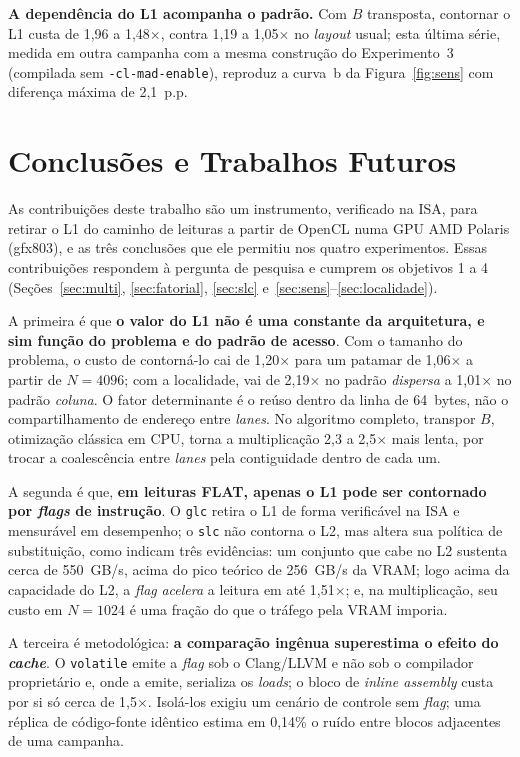 \documentclass[12pt]{article}
\begin{document}
\textbf{A dependência do L1 acompanha o padrão.} Com $B$ transposta, contornar o
L1 custa de 1,96 a 1,48$\times$, contra 1,19 a 1,05$\times$ no \textit{layout}
usual; esta última série, medida em outra campanha com a mesma construção do
Experimento~3 (compilada sem \texttt{-cl-mad-enable}), reproduz a curva~b da Figura~\ref{fig:sens} com diferença máxima de 2,1~p.p.

\section{Conclusões e Trabalhos Futuros}
\label{sec:conclusao}

As contribuições deste trabalho são um instrumento, verificado na ISA, para retirar
o L1 do caminho de leituras a partir de OpenCL numa GPU AMD Polaris (gfx803), e
as três conclusões que ele permitiu nos quatro experimentos. Essas contribuições respondem à
pergunta de pesquisa e cumprem os objetivos 1 a 4 (Seções~\ref{sec:multi},
\ref{sec:fatorial}, \ref{sec:slc} e~\ref{sec:sens}--\ref{sec:localidade}).

A primeira é que \textbf{o valor do L1 não é uma constante da arquitetura, e sim
função do problema e do padrão de acesso}. Com o tamanho do problema, o custo
de contorná-lo cai de 1,20$\times$ para um patamar de 1,06$\times$ a partir de
$N=4096$; com a
localidade, vai de 2,19$\times$ no padrão \textit{dispersa} a 1,01$\times$ no
padrão \textit{coluna}. O fator determinante é o reúso dentro da linha de 64~bytes, não o
compartilhamento de endereço entre \textit{lanes}. No algoritmo completo,
transpor $B$, otimização clássica em CPU, torna a multiplicação 2,3 a
2,5$\times$ mais lenta, por trocar a coalescência entre \textit{lanes} pela
contiguidade dentro de cada um.

A segunda é que, \textbf{em leituras FLAT, apenas o L1 pode ser contornado por
\textit{flags} de instrução}. O \texttt{glc} retira o L1 de forma verificável na
ISA e mensurável em desempenho; o \texttt{slc} não contorna o L2, mas altera sua
política de substituição, como indicam três evidências: um conjunto que cabe no
L2 sustenta cerca de 550~GB/s, acima do pico teórico de 256~GB/s da VRAM; logo acima da
capacidade do L2, a \textit{flag} \emph{acelera} a leitura em até 1,51$\times$;
e, na multiplicação, seu custo em $N=1024$ é uma fração do que o tráfego pela
VRAM imporia.

A terceira é metodológica: \textbf{a comparação ingênua superestima o efeito do
\textit{cache}}. O \texttt{volatile} emite a \textit{flag} sob o Clang/LLVM e não
sob o compilador proprietário e, onde a emite, serializa os \textit{loads}; o
bloco de \textit{inline assembly} custa por si só cerca de 1,5$\times$. Isolá-los
exigiu um cenário de controle sem \textit{flag}; uma réplica de código-fonte
idêntico estima em 0,14\% o ruído entre blocos adjacentes de uma campanha.
\end{document}
